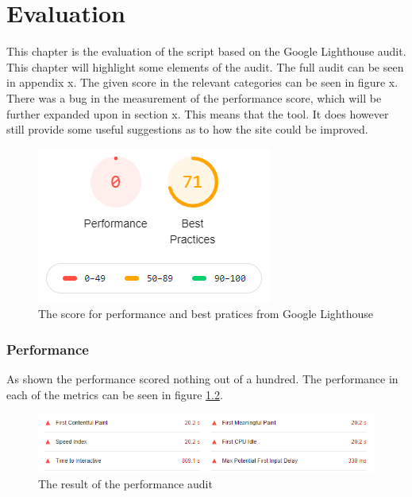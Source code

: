 \chapter{Evaluation}\label{Eval}
This chapter is the evaluation of the script based on the Google Lighthouse audit. This chapter will highlight some elements of the audit. The full audit can be seen in appendix x. The given score in the relevant categories can be seen in figure x. There was a bug in the measurement of the performance score, which will be further expanded upon in section x. This means that the tool. It does however still provide some useful suggestions as to how the site could be improved.




\begin{figure} [H]
	\centering
	\includegraphics[width=.8\textwidth]{Pictures/LighthouseGrade}
	\caption{The score for performance and best pratices from Google Lighthouse}
	\label{LighthouseGrade}
\end{figure}

\subsection{Performance}
As shown the performance scored nothing out of a hundred. The performance in each of the metrics can be seen in figure \ref{PerformanceAuditValues}.

\begin{figure} [H]
	\centering
	\includegraphics[width=.8\textwidth]{Pictures/PerformanceAuditValues}
	\caption{The result of the performance audit}
	\label{PerformanceAuditValues}
\end{figure}

